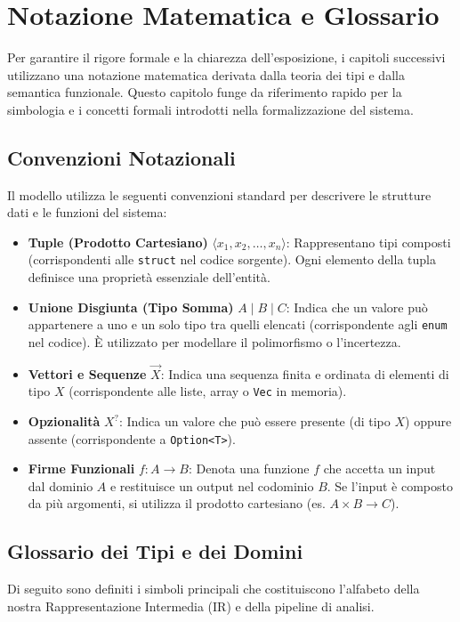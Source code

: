 \chapter{Notazione Matematica e Glossario}

Per garantire il rigore formale e la chiarezza dell'esposizione, i
capitoli successivi utilizzano una notazione matematica derivata
dalla teoria dei tipi e dalla semantica funzionale. Questo capitolo
funge da riferimento rapido per la simbologia e i concetti formali
introdotti nella formalizzazione del sistema.

\section{Convenzioni Notazionali}
Il modello utilizza le seguenti convenzioni standard per descrivere
le strutture dati e le funzioni del sistema:

\begin{itemize}
  \item \textbf{Tuple (Prodotto Cartesiano)} $\langle x_1, x_2,
    \dots, x_n \rangle$: Rappresentano tipi composti (corrispondenti
    alle \texttt{struct}  nel codice sorgente). Ogni elemento della
    tupla definisce una proprietà essenziale dell'entità.
  \item \textbf{Unione Disgiunta (Tipo Somma)} $A \mid B \mid C$:
    Indica che un valore può appartenere a uno e un solo tipo tra
    quelli elencati (corrispondente agli \texttt{enum} nel codice). È
    utilizzato per modellare il polimorfismo o l'incertezza.
  \item \textbf{Vettori e Sequenze} $\vec{X}$: Indica una sequenza
    finita e ordinata di elementi di tipo $X$ (corrispondente alle
    liste, array o \texttt{Vec} in memoria).
  \item \textbf{Opzionalità} $X^?$: Indica un valore che può essere
    presente (di tipo $X$) oppure assente (corrispondente a \texttt{Option<T>}).
  \item \textbf{Firme Funzionali} $f : A \to B$: Denota una funzione
    $f$ che accetta un input dal dominio $A$ e restituisce un output
    nel codominio $B$. Se l'input è composto da più argomenti, si
    utilizza il prodotto cartesiano (es. $A \times B \to C$).
\end{itemize}

\section{Glossario dei Tipi e dei Domini}
Di seguito sono definiti i simboli principali che costituiscono
l'alfabeto della nostra Rappresentazione Intermedia (IR) e della
pipeline di analisi.

